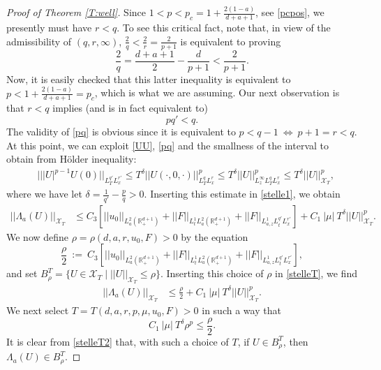 \documentclass[10pt,a4paper]{amsart}
\def \RN {\mathbb{R}_+^{d+1}}
\newcommand{\XT}{\mathcal{X}_T}
\begin{document}
\begin{proof}[Proof of Theorem \ref{T:well}]
Since $1<p<p_c = 1 + \frac{2(1-a)}{d+a+1}$, see \eqref{pcpos}, we presently must have $r<q$. To see this critical fact, note that, in view of the admissibility of $(q,r,\infty)$, $\frac 2q < \frac 2r = \frac{2}{p+1}$ is equivalent to proving
\[
\frac 2q = \frac{d+a+1}2 - \frac{d}{p+1} < \frac{2}{p+1}.
\]
Now, it is easily checked that this latter inequality is equivalent to $p < 1 + \frac{2(1-a)}{d+a+1} = p_c$, which is what we are assuming. Our next observation is that $r<q$ implies (and is in fact equivalent to)
\begin{equation}\label{pq}
p q' < q.
\end{equation}
The validity of \eqref{pq} is obvious since it is equivalent to $p<q-1\ \Longleftrightarrow\  p+1 = r <q$. At this point, we can exploit \eqref{UU}, \eqref{pq} and the smallness of the interval  
to obtain from H\"older inequality:
\begin{align}\label{Upq}
& |||U|^{p-1} U(0)||_{L^{q'}_T L^{r'}_x} 
\le T^{\delta} ||U(\cdot,0,\cdot)||^p_{L^{q}_T L^r_x}
 \le T^\delta ||U||^p_{L^\infty_z L^{q}_T L^{r}_x } \le T^\delta ||U||_{\XT}^p,
\end{align}
where we have let $\delta = \frac{1}{q'} - \frac{p}{q}>0$.
Inserting this estimate in \eqref{stelle1}, we obtain
\begin{align}\label{stelleT}
||\Lambda_a(U)||_{\XT} & \le C_3 \left[||u_0||_{L^2_a(\RN)} + ||F||_{L^1_t L^2_a(\RN)} + ||F||_{L^1_{a,z} L^{q'}_t L^{r'}_x}\right]
 +  C_1\ |\mu|\ T^\delta ||U||_{\XT}^p.
\end{align}
We now define $\rho = \rho(d,a,r, u_0, F)>0$ by the equation
\begin{equation}\label{choose}
\frac{\rho}2\ :=\ C_3 \left[||u_0||_{L^2_a(\RN)} + ||F||_{L^1_t L^2_a(\RN)} + ||F||_{L^1_{a,z} L^{q'}_t L^{r'}_x}\right],
\end{equation}
and set $B^T_\rho = \{U\in \XT\mid ||U||_{\XT}\le \rho\}$.
Inserting this choice of $\rho$ in \eqref{stelleT}, we find
\begin{align}\label{stelleT2}
||\Lambda_a(U)||_{\XT} & \le \frac{\rho}2
 +  C_1\ |\mu|\ T^\delta ||U||_{\XT}^p.
\end{align}
We next select $T = T(d,a,r,p,\mu,u_0,F)>0$ in such a  way that
\[
C_1\ |\mu|\ T^\delta \rho^p \le \frac{\rho}2.
\]
It is clear from \eqref{stelleT2} that, with such a choice of $T$, if $U\in B^T_\rho$, then $\Lambda_a(U)\in B^T_\rho$. 


\end{proof}
\end{document}

